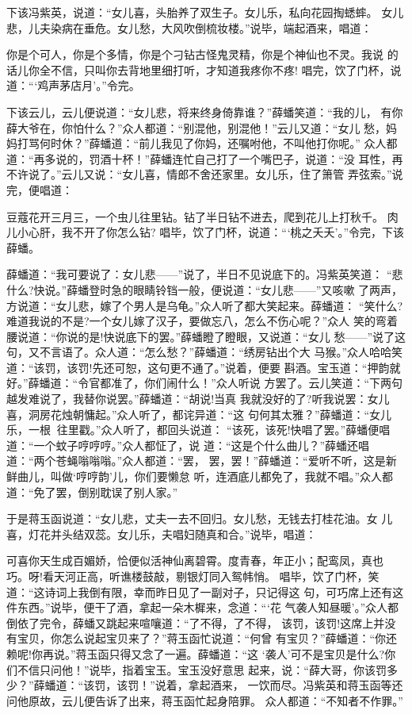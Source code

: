 下该冯紫英，说道：“女儿喜，头胎养了双生子。女儿乐，私向花园掏蟋蟀。
女儿悲，儿夫染病在垂危。女儿愁，大风吹倒梳妆楼。”说毕，端起酒来，唱道：

你是个可人，你是个多情，你是个刁钻古怪鬼灵精，你是个神仙也不灵。我说
的话儿你全不信，只叫你去背地里细打听，才知道我疼你不疼!
唱完，饮了门杯，说道：“‘鸡声茅店月’。”令完。

下该云儿，云儿便说道：“女儿悲，将来终身倚靠谁？”薛蟠笑道：“我的儿，
有你薛大爷在，你怕什么？”众人都道：“别混他，别混他！”云儿又道：“女儿
愁，妈妈打骂何时休？”薛蟠道：“前儿我见了你妈，还嘱咐他，不叫他打你呢。”
众人都道：“再多说的，罚酒十杯！”薛蟠连忙自己打了一个嘴巴子，说道：“没
耳性，再不许说了。”云儿又说：“女儿喜，情郎不舍还家里。女儿乐，住了箫管
弄弦索。”说完，便唱道：

豆蔻花开三月三，一个虫儿往里钻。钻了半日钻不进去，爬到花儿上打秋千。
肉儿小心肝，我不开了你怎么钻?
唱毕，饮了门杯，说道：“‘桃之夭夭’。”令完，下该薛蟠。

薛蟠道：“我可要说了：女儿悲——”说了，半日不见说底下的。冯紫英笑道：
“悲什么?快说。”薛蟠登时急的眼睛铃铛一般，便说道：“女儿悲——”又咳嗽
了两声，方说道：“女儿悲，嫁了个男人是乌龟。”众人听了都大笑起来。薛蟠道：
“笑什么?难道我说的不是?一个女儿嫁了汉子，要做忘八，怎么不伤心呢？”众人
笑的弯着腰说道：“你说的是!快说底下的罢。”薛蟠瞪了瞪眼，又说道：“女儿
愁——”说了这句，又不言语了。众人道：“怎么愁？”薛蟠道：“绣房钻出个大
马猴。”众人哈哈笑道：“该罚，该罚!先还可恕，这句更不通了。”说着，便要
斟酒。宝玉道：“押韵就好。”薛蟠道：“令官都准了，你们闹什么！”众人听说
方罢了。云儿笑道：“下两句越发难说了，我替你说罢。”薛蟠道：“胡说!当真
我就没好的了?听我说罢：女儿喜，洞房花烛朝慵起。”众人听了，都诧异道：“这
句何其太雅？”薛蟠道：“女儿乐，一根往里戳。”众人听了，都回头说道：
“该死，该死!快唱了罢。”薛蟠便唱道：“一个蚊子哼哼哼。”众人都怔了，说
道：“这是个什么曲儿？”薛蟠还唱道：“两个苍蝇嗡嗡嗡。”众人都道：“罢，
罢，罢！”薛蟠道：“爱听不听，这是新鲜曲儿，叫做‘哼哼韵’儿，你们要懒怠
听，连酒底儿都免了，我就不唱。”众人都道：“免了罢，倒别耽误了别人家。”

于是蒋玉函说道：“女儿悲，丈夫一去不回归。女儿愁，无钱去打桂花油。女
儿喜，灯花并头结双蕊。女儿乐，夫唱妇随真和合。”说毕，唱道：

可喜你天生成百媚娇，恰便似活神仙离碧霄。度青春，年正小；配鸾凤，真也
巧。呀!看天河正高，听谯楼鼓敲，剔银灯同入鸳帏悄。
唱毕，饮了门杯，笑道：“这诗词上我倒有限，幸而昨日见了一副对子，只记得这
句，可巧席上还有这件东西。”说毕，便干了酒，拿起一朵木樨来，念道：“‘花
气袭人知昼暖’。”众人都倒依了完令，薛蟠又跳起来喧嚷道：“了不得，了不得，
该罚，该罚!这席上并没有宝贝，你怎么说起宝贝来了？”蒋玉函忙说道：“何曾
有宝贝？”薛蟠道：“你还赖呢!你再说。”蒋玉函只得又念了一遍。薛蟠道：“这
‘袭人’可不是宝贝是什么?你们不信只问他！”说毕，指着宝玉。宝玉没好意思
起来，说：“薛大哥，你该罚多少？”薛蟠道：“该罚，该罚！”说着，拿起酒来，
一饮而尽。冯紫英和蒋玉函等还问他原故，云儿便告诉了出来，蒋玉函忙起身陪罪。
众人都道：“不知者不作罪。”

